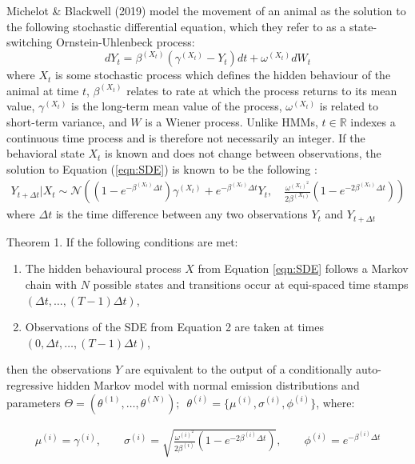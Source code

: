 
\renewcommand*{\thesubsection}{\Alph{subsection}}

Michelot \& Blackwell (2019) model the movement of an animal as the solution to the following stochastic differential equation, which they refer to as a state-switching Ornstein-Uhlenbeck process:
%
\begin{equation}
    \label{eqn:SDE}
    dY_t = \beta^{(X_t)}(\gamma^{(X_t)} - Y_t)dt + \omega^{(X_t)} dW_t
\end{equation}
%
where $X_t$ is some stochastic process which defines the hidden behaviour of the animal at time $t$, $\beta^{(X_t)}$ relates to rate at which the process returns to its mean value, $\gamma^{(X_t)}$ is the long-term mean value of the process, $\omega^{(X_t)}$ is related to short-term variance, and $W$ is a Wiener process. Unlike HMMs, $t \in \mathbb{R}$ indexes a continuous time process and is therefore not necessarily an integer. If the behavioral state $X_t$ is known and does not change between observations, the solution to Equation (\ref{eqn:SDE}) is known to be the following \citep{Michelot:2019}:
%
\begin{align}
    Y_{t+\Delta t} | X_{t} \sim \mathcal{N}\left((1-e^{-\beta^{(X_t)}\Delta t})\gamma^{(X_t)} + e^{-\beta^{(X_t)}\Delta t} Y_t,\quad \frac{\omega^{(X_t)^2}}{2\beta^{(X_t)}} (1-e^{-2\beta^{(X_t)}\Delta t})\right)
    \label{eqn:OU_sol}
\end{align}
%
where $\Delta t$ is the time difference between any two observations $Y_t$ and $Y_{t+\Delta t}$

\begin{theorem}{Theorem 1.}{}%
If the following conditions are met:
\begin{enumerate}
    \item The hidden behavioural process $X$ from Equation \ref{eqn:SDE} follows a Markov chain with $N$ possible states and transitions occur at equi-spaced time stamps $\left(\Delta t, \ldots, (T-1)\Delta t\right)$,
    
    \item Observations of the SDE from Equation 2 are taken at times $\left(0, \Delta t, \ldots, (T-1)\Delta t\right)$,
\end{enumerate}
then the observations $Y$ are equivalent to the output of a conditionally auto-regressive hidden Markov model with normal emission distributions and parameters $\Theta = (\theta^{(1)}, \ldots, \theta^{(N)}); \enspace \theta^{(i)} = \{\mu^{(i)},\sigma^{(i)},\phi^{(i)}\}$, where:

\begin{align}
\mu^{(i)} = \gamma^{(i)}, \qquad \sigma^{(i)} = \sqrt{\frac{\omega^{(i)^2}}{2\beta^{(i)}} (1-e^{-2\beta^{(i)}\Delta t})}, \qquad \phi^{(i)} = e^{-\beta^{(i)}\Delta t} \label{eqn:CarHMM_to_OU}
\end{align}

\end{theorem}

